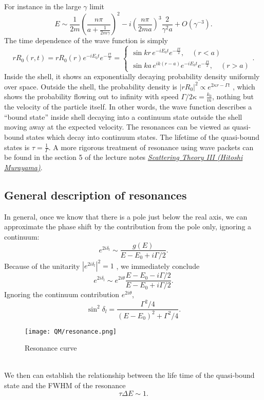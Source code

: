 For instance in the large $\gamma$ limit
\[E \sim \frac{1}{2m} \left( \frac{n\pi}{a + \frac{1}{2m\gamma}}\right)^2 - i \left( \frac{n\pi}{2ma}\right)^3 \frac{2}{\gamma^2 a} + O(\gamma^{-3}).\]
The time dependence of the wave function is simply
\[rR_0(r,t) = rR_0(r) e^{-iE_0t} e^{-\frac{\Gamma t}{2}} = \begin{cases} \sin kr \, e^{-iE_0t} e^{-\frac{\Gamma t}{2}} , \quad (r<a) \\\sin ka \,  e^{ik(r-a)} e^{-iE_0t} e^{-\frac{\Gamma t}{2}} , \quad (r > a) \end{cases}.\]
Inside the shell, it shows an exponentially decaying probability density uniformly over space.
Outside the shell, the probability density is $|rR_0|^2 \propto e^{2\kappa r-\Gamma t}$ , which shows the probability flowing out to infinity with speed $\Gamma/2\kappa = \frac{k_0}{m}$,
nothing but the velocity of the particle itself. In other words, the wave function describes a ``bound state'' inside shell decaying into a continuum state outside the shell moving away at the expected velocity. The resonances can be viewed as
quasi-bound states which decay into continuum states. The lifetime of the quasi-bound states is $\tau = \frac{1}{\Gamma}$.
A more rigorous treatment of resonance using wave packets can be found in the section 5 of the lecture notes 
\href{http://hitoshi.berkeley.edu/221B/index.html}{\emph{Scattering Theory III (Hitoshi Murayama)}}.

\subsection{General description of resonances}
In general, once we know that there is a pole just below the real axis, we can approximate the phase shift by the contribution from the pole only, ignoring a continuum:
\[e^{2i\delta_l} \sim \frac{g(E)}{E-E_0 + i\Gamma/2}.\]
Because of the unitarity $|e^{2i\delta_l}|^2 = 1$ , we immediately conclude
\[ e^{2i\delta_l} \sim e^{2i\theta}\frac{E-E_0-i\Gamma/2}{E-E_0 + i\Gamma/2} .\]
Ignoring the continuum contribution $e^{2i\theta}$,
\[\sin^2 \delta_l = \frac{\Gamma^2/4}{(E-E_0)^2+\Gamma^2/4}.\]
\begin{figure}[!h]
	\centering
	\texttt{[image: QM/resonance.png]}
	\caption{Resonance curve}
\end{figure}\\
We then can establish the relationship between the life time of the quasi-bound state and the FWHM of the resonance
\[\tau \Delta E \sim 1.\]

